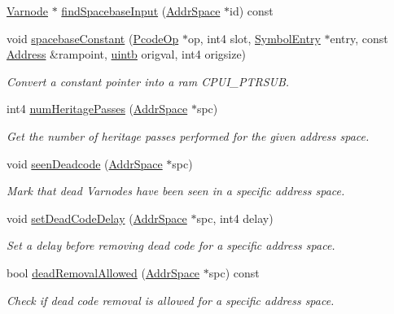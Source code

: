 \begin{DoxyCompactItemize}
\mbox{\hyperlink{class_varnode}{Varnode}} $\ast$ \mbox{\hyperlink{class_funcdata_a1eee1ea3fa8e72d17549a936567c97bf}{find\+Spacebase\+Input}} (\mbox{\hyperlink{class_addr_space}{Addr\+Space}} $\ast$id) const
\item 
void \mbox{\hyperlink{class_funcdata_aaf4a89f4e3da37a4107992689f7b89ff}{spacebase\+Constant}} (\mbox{\hyperlink{class_pcode_op}{Pcode\+Op}} $\ast$op, int4 slot, \mbox{\hyperlink{class_symbol_entry}{Symbol\+Entry}} $\ast$entry, const \mbox{\hyperlink{class_address}{Address}} \&rampoint, \mbox{\hyperlink{types_8h_a2db313c5d32a12b01d26ac9b3bca178f}{uintb}} origval, int4 origsize)
\begin{DoxyCompactList}\small\item\em Convert a constant pointer into a {\itshape ram} C\+P\+U\+I\+\_\+\+P\+T\+R\+S\+UB. \end{DoxyCompactList}\item 
int4 \mbox{\hyperlink{class_funcdata_a363bd02cb2f20cf1583951d5429a057b}{num\+Heritage\+Passes}} (\mbox{\hyperlink{class_addr_space}{Addr\+Space}} $\ast$spc)
\begin{DoxyCompactList}\small\item\em Get the number of heritage passes performed for the given address space. \end{DoxyCompactList}\item 
void \mbox{\hyperlink{class_funcdata_adc0c8b4dab63367913749e68fbd33789}{seen\+Deadcode}} (\mbox{\hyperlink{class_addr_space}{Addr\+Space}} $\ast$spc)
\begin{DoxyCompactList}\small\item\em Mark that dead Varnodes have been seen in a specific address space. \end{DoxyCompactList}\item 
void \mbox{\hyperlink{class_funcdata_ac40aef88ca7a101e4697df5e0ec5f605}{set\+Dead\+Code\+Delay}} (\mbox{\hyperlink{class_addr_space}{Addr\+Space}} $\ast$spc, int4 delay)
\begin{DoxyCompactList}\small\item\em Set a delay before removing dead code for a specific address space. \end{DoxyCompactList}\item 
bool \mbox{\hyperlink{class_funcdata_adaf432bbbd299e976c8f02fc97fb3dbe}{dead\+Removal\+Allowed}} (\mbox{\hyperlink{class_addr_space}{Addr\+Space}} $\ast$spc) const
\begin{DoxyCompactList}\small\item\em Check if dead code removal is allowed for a specific address space. \end{DoxyCompactList}\item 

\end{DoxyCompactItemize}
